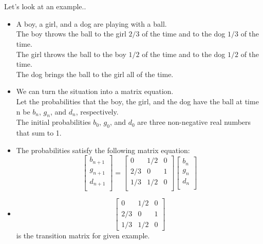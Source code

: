 \documentclass[compress]{beamer}
\begin{document}

\section{}
\subsection{}

\begin{frame}{Let's look at an example..}
  \begin{itemize}
    \item {
    A boy, a girl, and a dog are playing with a ball.\\ The boy throws the ball
    to the girl $2/3$ of the time and to the dog $1/3$ of the time.\\ The girl throws
    the ball to the boy $1/2$ of the time and to the dog $1/2$ of the time.\\ The dog
    brings the ball to the girl all of the time.
    }
   \pause \item{
   	We can turn the situation into a matrix equation. \\ Let the probabilities
   	that the boy, the girl, and the dog have the ball at time n be $b_n$, $g_n$, and $d_n$, respectively. \\ The initial probabilities $b_0$, $g_0$, and $d_0$ are three non-negative real numbers that sum to 1.
   	}
  \end{itemize}
\end{frame}

\begin{frame}
	\begin{itemize}
		\item {The probabilities satisfy the following matrix equation:
		\\
		\[
		\begin{bmatrix}
			b_{n+1} \\
			g_{n+1} \\
			d_{n+1} \\
		\end{bmatrix}
		=
		\begin{bmatrix}
		0 & 1/2 & 0 \\
		2/3 & 0 & 1 \\
		1/3 & 1/2 & 0 \\
		\end{bmatrix}
		\begin{bmatrix}
		b_n \\
		g_n \\
		d_n \\
		\end{bmatrix}
		\]
	}
	\item {
		
		\[\begin{bmatrix}
			0 & 1/2 & 0 \\
			2/3 & 0 & 1\\
			1/3 & 1/2 & 0
		\end{bmatrix}\] is the transition matrix for given example.
		}
	\end{itemize}
\end{frame}
\end{document}
